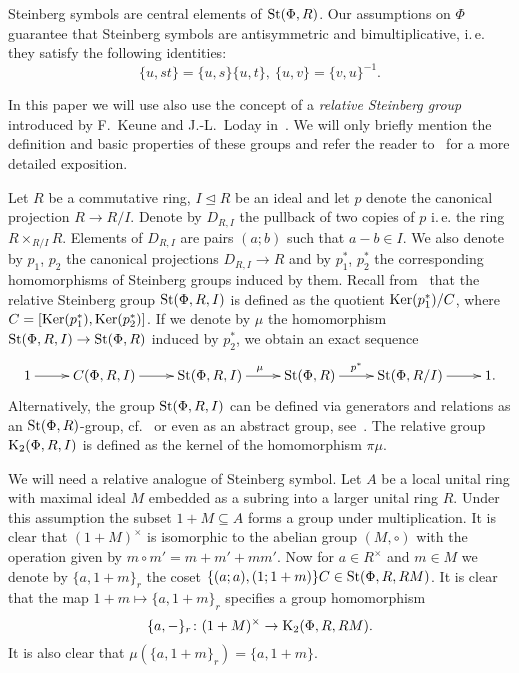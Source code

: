 Steinberg symbols are central elements of $\operatorname{St}(\Phi, R)$.
Our assumptions on $\Phi$ guarantee that Steinberg symbols are antisymmetric and bimultiplicative, i.\,e. they satisfy the following identities:
\begin{equation} \label{eq:symbol-properties} \{ u, st \} = \{ u, s\} \{ u, t \}, \ \{ u, v \} = \{ v, u\}^{-1}. \end{equation}

In this paper we will use also use the concept of a \textit{relative Steinberg group} introduced by F.~Keune and J.-L.~Loday in~\cite{Ke78, Lo78}.
We will only briefly mention the definition and basic properties of these groups and refer the reader to~\cite[\S~2.3]{LS20} for a more detailed exposition.

Let $R$ be a commutative ring, $I \trianglelefteq R$ be an ideal and let $p$ denote the canonical projection $R \to R/I$.
Denote by $D_{R, I}$ the pullback of two copies of $p$ i.\,e. the ring $R \times_{R/I} R$.
Elements of $D_{R, I}$ are pairs $(a; b)$ such that $a-b \in I$.
We also denote by $p_1$, $p_2$ the canonical projections $D_{R, I} \to R$ and by $p_1^*$, $p_2^*$ the corresponding homomorphisms of Steinberg groups induced by them.
Recall from~\cite[Definition~2.5]{LS20} that the relative Steinberg group $\operatorname{St}(\Phi, R, I)$ is defined as the quotient
 $\operatorname{Ker}(p_1^*) / C$, where $C = [\operatorname{Ker}(p_1^*), \operatorname{Ker}(p_2^*)]$.
If we denote by $\mu$ the homomorphism $\operatorname{St}(\Phi, R, I) \to \operatorname{St}(\Phi, R)$ induced by $p_2^*$, we obtain an exact sequence
\begin{equation}
    \xymatrix{1 \ar[r] & C(\Phi, R, I) \ar[r] & \St(\Phi, R, I) \ar[r]^\mu & \St(\Phi, R) \ar[r]^-{p^*} & \St(\Phi, R/I) \ar[r] & 1. }\label{eq:relative-Steinberg}
\end{equation}
Alternatively, the group $\operatorname{St}(\Phi, R, I)$ can be defined via generators and relations as an $\operatorname{St}(\Phi, R)$-group, cf.~\cite[Proposition~6]{S15}
 or even as an abstract group, see~\cite{V22}.
The relative group $\operatorname{K}_2(\Phi, R, I)$ is defined as the kernel of the homomorphism $\pi \mu$.

We will need a relative analogue of Steinberg symbol.
Let $A$ be a local unital ring with maximal ideal $M$ embedded as a subring into a larger unital ring $R$.
Under this assumption the subset $1+M \subseteq A$ forms a group under multiplication.
It is clear that $(1+M)^\times$ is isomorphic to the abelian group $(M, \circ)$ with the operation given by $m \circ m' = m + m' + mm'$.
Now for $a \in R^\times$ and $m \in M$ we denote by $\{a, 1+m\}_r$ the coset $\{(a; a), (1; 1+m)\}C \in \operatorname{St}(\Phi, R, RM)$.
It is clear that the map $1+m \mapsto \{a, 1+m\}_r$ specifies a group homomorphism
\[\{ a, -\}_r \colon (1+M)^\times \to \operatorname{K}_2(\Phi, R, RM). \]
It is also clear that $\mu(\{a, 1+m\}_r) = \{a, 1+m\}$.

